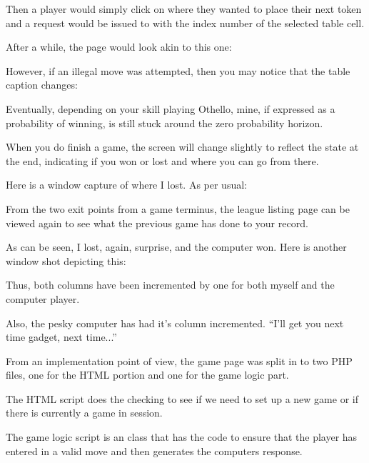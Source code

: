 
\items	Then a player would simply click on where they wanted to place their next token and a  request would be issued to  with the index number of the selected table cell.

\subitems	After a while, the page would look akin to this one:


\subitems	However, if an illegal move was attempted, then you may notice that the table caption changes:


\items	Eventually, depending on your skill playing Othello, mine, if expressed as a probability of winning, is still stuck around the zero probability horizon.

\subitems	When you do finish a game, the screen will change slightly to reflect the state at the end, indicating if you won or lost and where you can go from there.

\subitems	Here is a window capture of where I lost. As per usual:


\items	From the two exit points from a game terminus, the league listing page can be viewed again to see what the previous game has done to your record.

\subitems	As can be seen, I lost, again, surprise, and the computer won. Here is another window shot depicting this:


\subitems	Thus, both  columns have been incremented by one for both myself and the computer player.

\subitems	Also, the pesky computer has had it's  column incremented. ``I'll get you next time gadget, next time...''

\items	From an implementation point of view, the game page was split in to two PHP files, one for the HTML portion and one for the game logic part.

\items	The HTML script does the checking to see if we need to set up a new game or if there is currently a game in session.


\items	The game logic script is an class that has the code to ensure that the player has entered in a valid move and then generates the computers response.


